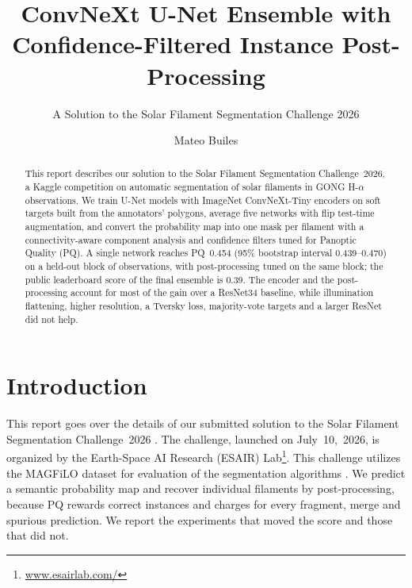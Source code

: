 \title{ConvNeXt U-Net Ensemble with Confidence-Filtered Instance Post-Processing}
\subtitle{A Solution to the Solar Filament Segmentation Challenge 2026} %

\author{Mateo Builes}

\begin{abstract}
    This report describes our solution to the Solar Filament Segmentation Challenge~2026, a Kaggle competition on automatic segmentation of solar filaments in GONG H-$\alpha$ observations.
    We train U-Net models with ImageNet ConvNeXt-Tiny encoders on soft targets built from the annotators' polygons, average five networks with flip test-time augmentation, and convert the probability map into one mask per filament with a connectivity-aware component analysis and confidence filters tuned for Panoptic Quality (PQ).
    A single network reaches PQ~0.454 (95\% bootstrap interval 0.439--0.470) on a held-out block of observations, with post-processing tuned on the same block; the public leaderboard score of the final ensemble is 0.39.
    The encoder and the post-processing account for most of the gain over a ResNet34 baseline, while illumination flattening, higher resolution, a Tversky loss, majority-vote targets and a larger ResNet did not help.
\end{abstract}

\maketitle

\section{Introduction}
This report goes over the details of our submitted solution to the Solar Filament Segmentation Challenge~2026 \cite{filament-segmentation-2026}. The challenge, launched on July~10,~2026, is organized by the Earth-Space AI Research (ESAIR) Lab\footnote{\href{https://www.esairlab.com/home}{www.esairlab.com/}}. This challenge utilizes the MAGFiLO dataset for evaluation of the segmentation algorithms \cite{ahmadzadeh2024dataset}.
We predict a semantic probability map and recover individual filaments by post-processing, because PQ rewards correct instances and charges for every fragment, merge and spurious prediction. We report the experiments that moved the score and those that did not.

